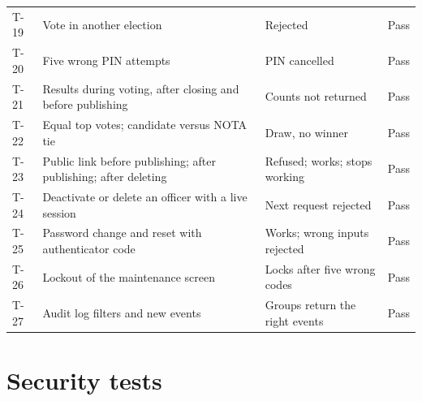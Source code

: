 \begin{center}
\begin{tabularx}{\linewidth}{@{}l >{\raggedright\arraybackslash}p{4.6cm} X l@{}}
T-19 & Vote in another election & Rejected & Pass \\
T-20 & Five wrong PIN attempts & PIN cancelled & Pass \\
T-21 & Results during voting, after closing and before publishing & Counts not returned & Pass \\
T-22 & Equal top votes; candidate versus NOTA tie & Draw, no winner & Pass \\
T-23 & Public link before publishing; after publishing; after deleting & Refused; works; stops working & Pass \\
T-24 & Deactivate or delete an officer with a live session & Next request rejected & Pass \\
T-25 & Password change and reset with authenticator code & Works; wrong inputs rejected & Pass \\
T-26 & Lockout of the maintenance screen & Locks after five wrong codes & Pass \\
T-27 & Audit log filters and new events & Groups return the right events & Pass \\
\bottomrule
\end{tabularx}
\end{center}

\section{Security tests}

